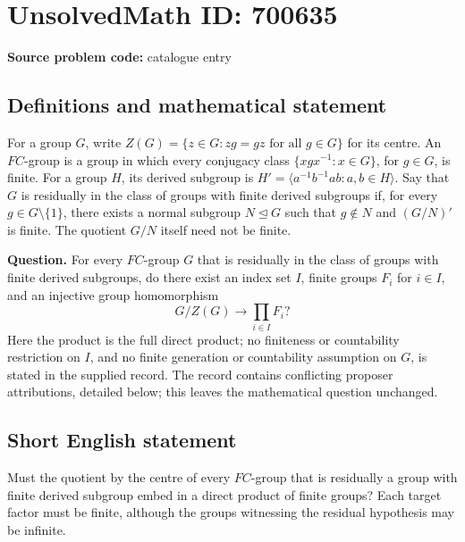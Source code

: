 \documentclass[11pt]{article}
\begin{document}
\section*{UnsolvedMath ID: 700635}
\textbf{Source problem code:} catalogue entry
\subsection{Definitions and mathematical statement}
For a group \(G\), write \(Z(G)=\{z\in G:zg=gz\text{ for all }g\in G\}\) for its centre. An \(FC\)-group is a group in which every conjugacy class \(\{xgx^{-1}:x\in G\}\), for \(g\in G\), is finite. For a group \(H\), its derived subgroup is \(H'=\langle a^{-1}b^{-1}ab:a,b\in H\rangle\). Say that \(G\) is residually in the class of groups with finite derived subgroups if, for every \(g\in G\setminus\{1\}\), there exists a normal subgroup \(N\trianglelefteq G\) such that \(g\notin N\) and \((G/N)'\) is finite. The quotient \(G/N\) itself need not be finite.

\textbf{Question.} For every \(FC\)-group \(G\) that is residually in the class of groups with finite derived subgroups, do there exist an index set \(I\), finite groups \(F_i\) for \(i\in I\), and an injective group homomorphism
\[
G/Z(G)\longrightarrow\prod_{i\in I}F_i?
\]
Here the product is the full direct product; no finiteness or countability restriction on \(I\), and no finite generation or countability assumption on \(G\), is stated in the supplied record. The record contains conflicting proposer attributions, detailed below; this leaves the mathematical question unchanged.
\subsection{Short English statement}
Must the quotient by the centre of every \(FC\)-group that is residually a group with finite derived subgroup embed in a direct product of finite groups? Each target factor must be finite, although the groups witnessing the residual hypothesis may be infinite.
\end{document}
